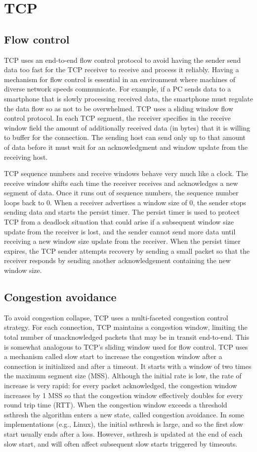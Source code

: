 \section{TCP}
\subsection{Flow control}
TCP uses an end-to-end flow control protocol to avoid having the sender send
data too fast for the TCP receiver to receive and process it reliably. Having
a mechanism for flow control is essential in an environment where machines of
diverse network speeds communicate. For example, if a PC sends data to a
smartphone that is slowly processing received data, the smartphone must regulate
the data flow so as not to be overwhelmed. TCP uses a sliding window flow
control protocol. In each TCP segment, the receiver specifies in the receive
window field the amount of additionally received data (in bytes) that it is
willing to buffer for the connection. The sending host can send only up to
that amount of data before it must wait for an acknowledgment and window update
from the receiving host.

TCP sequence numbers and receive windows behave very much like a clock. The
receive window shifts each time the receiver receives and acknowledges a new
segment of data. Once it runs out of sequence numbers, the sequence number
loops back to 0. When a receiver advertises a window size of 0, the sender stops
sending data and starts the persist timer. The persist timer is used to protect
TCP from a deadlock situation that could arise if a subsequent window size
update from the receiver is lost, and the sender cannot send more data until
receiving a new window size update from the receiver. When the persist timer
expires, the TCP sender attempts recovery by sending a small packet so that
the receiver responds by sending another acknowledgement containing the new
window size.

\subsection{Congestion avoidance}
To avoid congestion collapse, TCP uses a multi-faceted congestion control strategy. 
For each connection, TCP maintains a congestion window, limiting the total number 
of unacknowledged packets that may be in transit end-to-end. This is somewhat 
analogous to TCP's sliding window used for flow control. TCP uses a mechanism 
called slow start to increase the congestion window after a connection is 
initialized and after a timeout. It starts with a window of two times the maximum 
segment size (MSS). Although the initial rate is low, the rate of increase is 
very rapid: for every packet acknowledged, the congestion window increases by 1
 MSS so that the congestion window effectively doubles for every round trip time
 (RTT). When the congestion window exceeds a threshold ssthresh the algorithm
 enters a new state, called congestion avoidance. In some implementations (e.g.,
 Linux), the initial ssthresh is large, and so the first slow start usually ends
 after a loss. However, ssthresh is updated at the end of each slow start, and
 will often affect subsequent slow starts triggered by timeouts.

